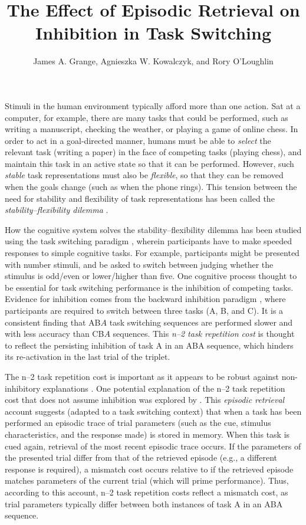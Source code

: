 \documentclass[a4paper, doc, natbib]{apa6}
\title{The Effect of Episodic Retrieval on Inhibition in Task Switching}
\author{James A. Grange, Agnieszka W. Kowalczyk, and Rory O'Loughlin}
\affiliation{School of Psychology, Keele University, UK}
\begin{document}
\maketitle

Stimuli in the human environment typically afford more than one action. Sat at a computer, for example, there are many tasks that could be performed, such as writing a manuscript, checking the weather, or playing a game of online chess. In order to act in a goal-directed manner, humans must be able to \emph{select} the relevant task (writing a paper) in the face of competing tasks (playing chess), and maintain this task in an active state so that it can be performed. However, such \emph{stable} task representations must also be \emph{flexible}, so that they can be removed when the goals change (such as when the phone rings). This tension between the need for stability and flexibility of task representations has been called the \emph{stability--flexibility dilemma} \citep{Goschke2000}. 

How the cognitive system solves the stability--flexibility dilemma has been studied using the task switching paradigm \citep{Grange2014a,Kiesel2010,Vandierendonck2010}, wherein participants have to make speeded responses to simple cognitive tasks. For example, participants might be presented with number stimuli, and be asked to switch between judging whether the stimulus is odd/even or lower/higher than five. One cognitive process thought to be essential for task switching performance is the inhibition of competing tasks. Evidence for inhibition comes from the backward inhibition paradigm \citep{Koch2010, Mayr2000}, where participants are required to switch between three tasks (A, B, and C).  It is a consistent finding that AB$A$ task switching sequences are performed slower and with less accuracy than CB$A$ sequences. This \emph{n--2 task repetition cost} is thought to reflect the persisting inhibition of task A in an ABA sequence, which hinders its re-activation in the last trial of the triplet.

The n--2 task repetition cost is important as it appears to be robust against non-inhibitory explanations \citep{Mayr2007}. One potential explanation of the n--2 task repetition cost that does not assume inhibition was explored by \cite{Mayr2002}. This \emph{episodic retrieval} account \citep{Neill1997} suggests (adapted to a task switching context) that when a task has been performed an episodic trace of trial parameters (such as the cue, stimulus characteristics, and the response made) is stored in memory. When this task is cued again, retrieval of the most recent episodic trace occurs. If the parameters of the presented trial differ from that of the retrieved episode (e.g., a different response is required), a mismatch cost occurs relative to if the retrieved episode matches parameters of the current trial (which will prime performance). Thus, according to this account, n--2 task repetition costs reflect a mismatch cost, as trial parameters typically differ between both instances of task A in an ABA sequence.
\end{document}
